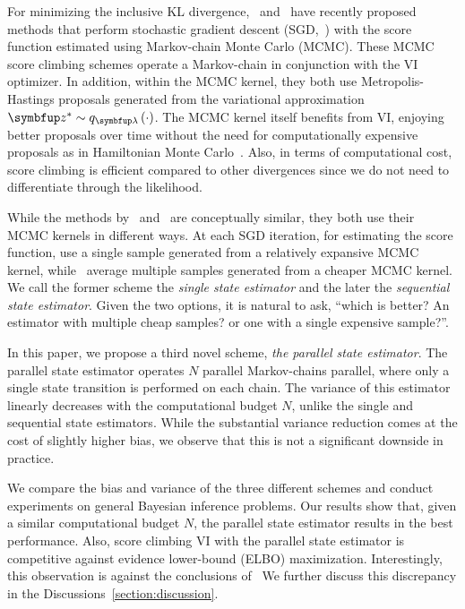 For minimizing the inclusive KL divergence,~\citet{NEURIPS2020_b2070693} and~\citet{pmlr-v124-ou20a} have recently proposed  methods that perform stochastic gradient descent (SGD,~\citealt{robbins_stochastic_1951}) with the score function estimated using Markov-chain Monte Carlo (MCMC).
These MCMC score climbing schemes operate a Markov-chain in conjunction with the VI optimizer.
In addition, within the MCMC kernel, they both use Metropolis-Hastings proposals generated from the variational approximation \(\vz^* \sim q_{\vlambda}\left(\cdot\right)\).
The MCMC kernel itself benefits from VI, enjoying better proposals over time without the need for computationally expensive proposals as in Hamiltonian Monte Carlo~\citep{duane_hybrid_1987, neal_mcmc_2011, betancourt_conceptual_2017}.
Also, in terms of computational cost, score climbing is efficient compared to other divergences since we do not need to differentiate through the likelihood.

While the methods by~\citet{NEURIPS2020_b2070693} and~\citet{pmlr-v124-ou20a} are conceptually similar, they both use their MCMC kernels in different ways.
At each SGD iteration, for estimating the score function, \citeauthor{NEURIPS2020_b2070693} use a single sample generated from a relatively expansive MCMC kernel, while~\citeauthor{pmlr-v124-ou20a} average multiple samples generated from a cheaper MCMC kernel.
We call the former scheme the \textit{single state estimator} and the later the \textit{sequential state estimator}.
Given the two options, it is natural to ask, ``which is better? An estimator with multiple cheap samples? or one with a single expensive sample?''.

In this paper, we propose a third novel scheme, \textit{the parallel state estimator}.
The parallel state estimator operates \(N\) parallel Markov-chains parallel, where only a single state transition is performed on each chain.
The variance of this estimator linearly decreases with the computational budget \(N\), unlike the single and sequential state estimators.
While the substantial variance reduction comes at the cost of slightly higher bias, we observe that this is not a significant downside in practice.

We compare the bias and variance of the three different schemes and conduct experiments on general Bayesian inference problems.
Our results show that, given a similar computational budget \(N\), the parallel state estimator results in the best performance.
Also, score climbing VI with the parallel state estimator is competitive against evidence lower-bound  (ELBO) maximization.
Interestingly, this observation is against the conclusions of~\cite{dhaka_challenges_2021}
We further discuss this discrepancy in the Discussions~\cref{section:discussion}.


